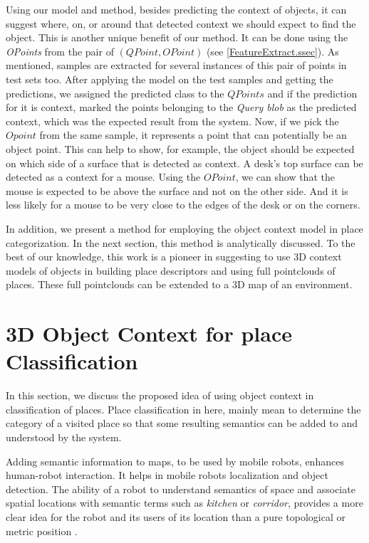 Using our model and method, besides predicting the context of objects, it can suggest where, on, or around that detected context we should expect to find the object. This is another unique benefit of our method. It can be done using the {\it OPoints} from the pair of $(QPoint, OPoint)$ (see  \ref{FeatureExtract.ssec}). As mentioned, samples are extracted for several instances of this pair of points in test sets too. After applying the model on the test samples and getting the predictions, we assigned the predicted class to the $QPoints$ and if the prediction for it is context, marked the points belonging to the {\it Query blob} as the predicted context, which was the expected result from the system. Now, if we pick the $Opoint$ from the same sample, it represents a point that can potentially be an object point. This can help to show, for example, the object should be expected on which side of a surface that is detected as context. A desk's top surface can be detected as a context for a mouse. Using the $OPoint$, we can show that the mouse is expected to be above the surface and not on the other side. And it is less likely for a mouse to be very close to the edges of the desk or on the corners.

In addition, we present a method for employing the object context model in place categorization.  In the next section, this method is analytically discussed. To the best of our knowledge, this work is a pioneer in suggesting to use 3D context models of objects in building place descriptors and using full pointclouds of places. These full pointclouds can be extended to a 3D map of an environment.

\section{3D Object Context for place Classification}
\label{3D Object Context for place Classification.sec}

In this section, we discuss the proposed idea of using object context in classification of places.
Place classification in here, mainly mean to determine the category of a visited place so that some resulting semantics 
can be added to and understood by the system.

Adding semantic information to maps, to be used by mobile robots, enhances human-robot interaction.
It helps in mobile robots localization and object detection.
The ability of a robot to understand semantics of space and associate spatial locations with semantic terms 
such as {\it kitchen} or {\it corridor}, provides a more clear idea for the robot and its users of its location than a pure 
topological or metric position \cite{pronobis2011phd}.   

